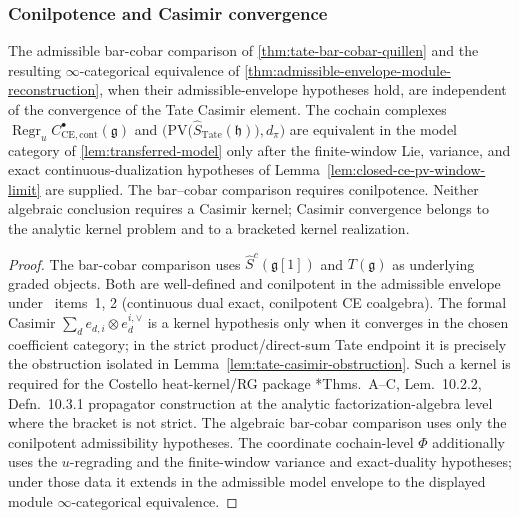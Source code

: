 \subsubsection{Conilpotence and Casimir convergence}

\begin{prop}
  \label{prop:quillen-vs-casimir}
  The admissible bar-cobar comparison of \ref{thm:tate-bar-cobar-quillen}
  and the resulting $\infty$-categorical equivalence of
  \ref{thm:admissible-envelope-module-reconstruction}, when their
  admissible-envelope hypotheses hold, are independent
  of the convergence of the Tate Casimir element. The cochain
  complexes $\operatorname{Regr}_u
  C^\bullet_{\mathrm{CE},\mathrm{cont}}(\mathfrak g)$
  and $\bigl(\mathrm{PV}\bigl(
  \widehat S_{\mathrm{Tate}}(\mathfrak h)\bigr),d_\pi\bigr)$ are
  equivalent in the model category of \ref{lem:transferred-model} only
  after the finite-window Lie, variance, and exact
  continuous-dualization hypotheses of
  Lemma~\ref{lem:closed-ce-pv-window-limit} are supplied.  The
  bar--cobar comparison requires conilpotence.  Neither algebraic
  conclusion requires a Casimir kernel; Casimir convergence belongs to
  the analytic kernel problem and to a bracketed kernel realization.
\end{prop}

\begin{proof}
  The bar-cobar comparison uses
  $\widehat S^c(\mathfrak g[1])$ and $T(\mathfrak g)$ as
  underlying graded objects. Both are well-defined and conilpotent
  in the admissible envelope under \alpharef\ items~1, 2 (continuous
  dual exact, conilpotent CE coalgebra). The formal Casimir
  \(\sum_d e_{d,i}\otimes e_d^{i,\vee}\) is a kernel hypothesis only when
  it converges in the chosen coefficient category; in the strict
  product/direct-sum Tate endpoint it is precisely the obstruction
  isolated in Lemma~\ref{lem:tate-casimir-obstruction}.  Such a kernel is
	  required for the Costello heat-kernel/RG package
	  \cite{costello-renormalization}*{Thms.~A--C, Lem.~10.2.2, Defn.~10.3.1}
	  propagator construction at the analytic factorization-algebra level
  where the bracket is not strict.  The algebraic
	  bar-cobar comparison uses only the conilpotent admissibility
  hypotheses.  The coordinate cochain-level $\Phi$ additionally uses
  the \(u\)-regrading and the finite-window variance and exact-duality
  hypotheses; under those data it extends in the admissible model
  envelope to the displayed module $\infty$-categorical equivalence.
\end{proof}

